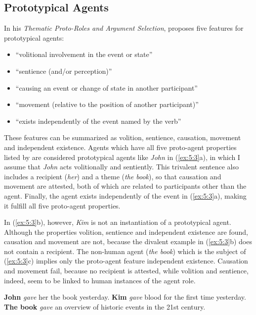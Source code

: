 \documentclass[output=paper]{LSP/langsci}
\begin{document}
\subsection{Prototypical Agents} \label{sec:5:2:1}
In his \textit{Thematic Proto-Roles and Argument Selection}, \citet[572]{Dowty1991} proposes five features for prototypical agents:

\begin{itemize}
\item “volitional involvement in the event or state”
\item “sentience (and/or perception)”
\item “causing an event or change of state in another participant”
\item “movement (relative to the position of another participant)”
\item “exists independently of the event named by the verb”
\end{itemize}

These features can be summarized as volition, sentience, causation, movement and independent existence. Agents which have all five proto-agent properties listed by \citet{Dowty1991} are considered prototypical agents like \textit{John} in (\ref{ex:5:3}a), in which I assume that \textit{John} acts volitionally and sentiently. This trivalent sentence also includes a recipient (\textit{her}) and a theme (\textit{the book}), so that causation and movement are attested, both of which are related to participants other than the agent. Finally, the agent exists independently of the event in (\ref{ex:5:3}a), making it fulfill all five proto-agent properties.

In (\ref{ex:5:3}b), however, \textit{Kim} is not an instantiation of a prototypical agent. Although the properties volition, sentience and independent existence are found, causation and movement are not, because the divalent example in (\ref{ex:5:3}b) does not contain a recipient. The non-human agent (\textit{the book}) which is the subject of (\ref{ex:5:3}c) implies only the proto-agent feature independent existence. Causation and movement fail, because no recipient is attested, while volition and sentience, indeed, seem to be linked to human instances of the agent role.\newline 

\ea \label{ex:5:3}
\ea \textbf{John} \textit{gave} her the book yesterday.
\ex \textbf{Kim} \textit{gave} blood for the first time yesterday.
\ex \textbf{The book} \textit{gave} an overview of historic events in the 21st century.
\z
\z
\end{document}
